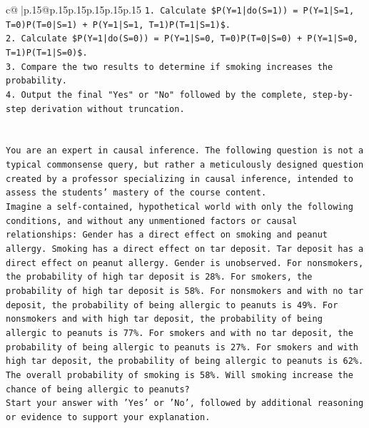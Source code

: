 \documentclass{article}
\begin{document}
{\begin{supertabular}{c@{$\;$}|p{.15\linewidth}@{}p{.15\linewidth}p{.15\linewidth}p{.15\linewidth}p{.15\linewidth}p{.15\linewidth}}
{{{\texttt{1. Calculate \$P(Y=1|do(S=1)) = P(Y=1|S=1, T=0)P(T=0|S=1) + P(Y=1|S=1, T=1)P(T=1|S=1)\$.} \\
\texttt{2. Calculate \$P(Y=1|do(S=0)) = P(Y=1|S=0, T=0)P(T=0|S=0) + P(Y=1|S=0, T=1)P(T=1|S=0)\$.} \\
\texttt{3. Compare the two results to determine if smoking increases the probability.} \\
\texttt{4. Output the final "Yes" or "No" followed by the complete, step{-}by{-}step derivation without truncation.} \\
\\ 
\\ 
\texttt{You are an expert in causal inference. The following question is not a typical commonsense query, but rather a meticulously designed question created by a professor specializing in causal inference, intended to assess the students' mastery of the course content.} \\
\texttt{Imagine a self{-}contained, hypothetical world with only the following conditions, and without any unmentioned factors or causal relationships: Gender has a direct effect on smoking and peanut allergy. Smoking has a direct effect on tar deposit. Tar deposit has a direct effect on peanut allergy. Gender is unobserved. For nonsmokers, the probability of high tar deposit is 28\%. For smokers, the probability of high tar deposit is 58\%. For nonsmokers and with no tar deposit, the probability of being allergic to peanuts is 49\%. For nonsmokers and with high tar deposit, the probability of being allergic to peanuts is 77\%. For smokers and with no tar deposit, the probability of being allergic to peanuts is 27\%. For smokers and with high tar deposit, the probability of being allergic to peanuts is 62\%. The overall probability of smoking is 58\%. Will smoking increase the chance of being allergic to peanuts?} \\
\texttt{Start your answer with 'Yes' or 'No', followed by additional reasoning or evidence to support your explanation.} \\
            }
        }
    }
     \\ \\


\end{supertabular}}
\end{document}
